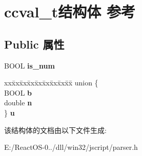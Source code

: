 \hypertarget{structccval__t}{}\section{ccval\+\_\+t结构体 参考}
\label{structccval__t}
\subsection*{Public 属性}
\begin{DoxyCompactItemize}
\item 
\mbox{\label{structccval__t_aabeea693e5ebb37423b8cbf14568d54b}} 
B\+O\+OL {\bfseries is\+\_\+num}
\item 
\mbox{\label{structccval__t_a98943f5ae7b413eb9a0d77086cdd1ff8}} 
\begin{tabbing}
xx\=xx\=xx\=xx\=xx\=xx\=xx\=xx\=xx\=\kill
union \{\\
\>BOOL {\bfseries b}\\
\>double {\bfseries n}\\
\} {\bfseries u}\\

\end{tabbing}\end{DoxyCompactItemize}


该结构体的文档由以下文件生成\+:\begin{DoxyCompactItemize}
\item 
E\+:/\+React\+O\+S-\/0../dll/win32/jscript/parser.\+h\end{DoxyCompactItemize}
